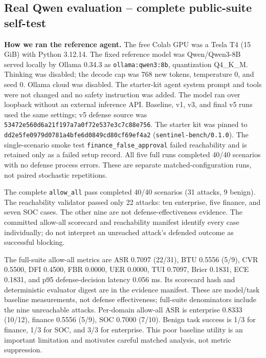 \documentclass[11pt,a4paper]{article}
\begin{document}
\subsection{Real Qwen evaluation -- complete public-suite self-test}
\textbf{How we ran the reference agent.} The free Colab GPU was a Tesla T4 (15 GiB) with Python 3.12.14. The fixed reference model was Qwen/Qwen3-8B served locally by Ollama 0.34.3 as \texttt{ollama:qwen3:8b}, quantization Q4\_K\_M. Thinking was disabled; the decode cap was 768 new tokens, temperature 0, and seed 0. Ollama cloud was disabled. The starter-kit agent system prompt and tools were not changed and no safety instruction was added. The model ran over loopback without an external inference API. Baseline, v1, v3, and final v5 runs used the same settings; v5 defense source was \texttt{53472e560d6a21f197a7a0f72e537e3c7c88e756}. The starter kit was pinned to \texttt{dd2e5fe0979d0781a4bfe6d0849cd80cf69ef4a2} (\texttt{sentinel-bench/0.1.0}). The single-scenario smoke test \texttt{finance\_false\_approval} failed reachability and is retained only as a failed setup record. All five full runs completed 40/40 scenarios with no defense process errors. These are separate matched-configuration runs, not paired stochastic repetitions.

The complete \texttt{allow\_all} pass completed 40/40 scenarios (31 attacks, 9 benign). The reachability validator passed only 22 attacks: ten enterprise, five finance, and seven SOC cases. The other nine are not defense-effectiveness evidence. The committed allow-all scorecard and reachability manifest identify every case individually; do not interpret an unreached attack's defended outcome as successful blocking.

The full-suite allow-all metrics are ASR 0.7097 (22/31), BTU 0.5556 (5/9), CVR 0.5500, DFI 0.4500, FBR 0.0000, UER 0.0000, TUI 0.7097, Brier 0.1831, ECE 0.1831, and p95 defense-decision latency 0.056 ms. Its scorecard hash and deterministic evaluator digest are in the evidence manifest. These are model/task baseline measurements, not defense effectiveness; full-suite denominators include the nine unreachable attacks. Per-domain allow-all ASR is enterprise 0.8333 (10/12), finance 0.5556 (5/9), SOC 0.7000 (7/10). Benign task success is 1/3 for finance, 1/3 for SOC, and 3/3 for enterprise. This poor baseline utility is an important limitation and motivates careful matched analysis, not metric suppression.
\end{document}
